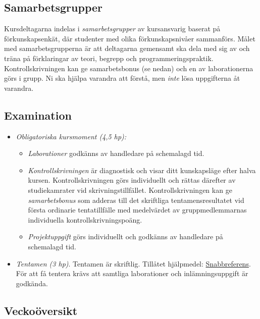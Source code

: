 \documentclass[a4paper,12pt,oneside]{memoir}
\newcommand{\TENTADATUM}{\colorbox{yellow}{Måndagen den 13:e Januari, kl 08:00--13:00, sal: MA9A-E.}}
\newcommand{\KSDATUM}{\colorbox{yellow}{Tisdagen 29:e Oktober, kl 14:00--19:00, sal: Sparta A-D.}}
\begin{document}
\subsection{Samarbetsgrupper}\label{samarbetsgrupper}

Kursdeltagarna indelas i \emph{samarbetsgrupper} av kursansvarig baserat
på förkunskapsenkät, där studenter med olika förkunskapsnivåer
sammanförs. Målet med samarbetsgrupperna är att deltagarna gemensamt ska
dela med sig av och träna på förklaringar av teori, begrepp och
programmeringspraktik. Kontrollskrivningen kan ge samarbetsbonus (se
nedan) och en av laborationerna görs i grupp. Ni ska hjälpa varandra att
förstå, men \emph{inte} lösa uppgifterna åt varandra.

\subsection{Examination}\label{examination}

\begin{itemize}
\item
  \emph{Obligatoriska kursmoment (4,5 hp):}

  \begin{itemize}
  \item
    \emph{Laborationer} godkänns av handledare på schemalagd tid.
  \item
    \emph{Kontrollskrivningen} är diagnostisk och visar ditt kunskapsläge efter
    halva kursen. Kontrollskrivningen görs individuellt och rättas
    därefter av studiekamrater vid skrivningstillfället.
    Kontrollskrivningen kan ge \emph{samarbetsbonus} som adderas till
    det skriftliga tentamensresultatet vid första ordinarie
    tentatillfälle med medelvärdet av gruppmedlemmarnas individuella
    kontrollskrivningspoäng. %
  \item
    \emph{Projektuppgift} görs individuellt och godkänns av handledare på
    schemalagd tid.
  \end{itemize}

\item
  \emph{Tentamen (3 hp)}. Tentamen är skriftlig. Tillåtet hjälpmedel:
  \href{http://cs.lth.se/pgk/quickref}{Snabbreferens}. \\
  För att få tentera krävs att samtliga laborationer och inlämningsuppgift är godkända.\\
\end{itemize}

\clearpage

\subsection*{Veckoöversikt}

\resizebox{\columnwidth}{!}{%
{\fontsize{12pt}{24pt}\selectfont

}
}
\end{document}
